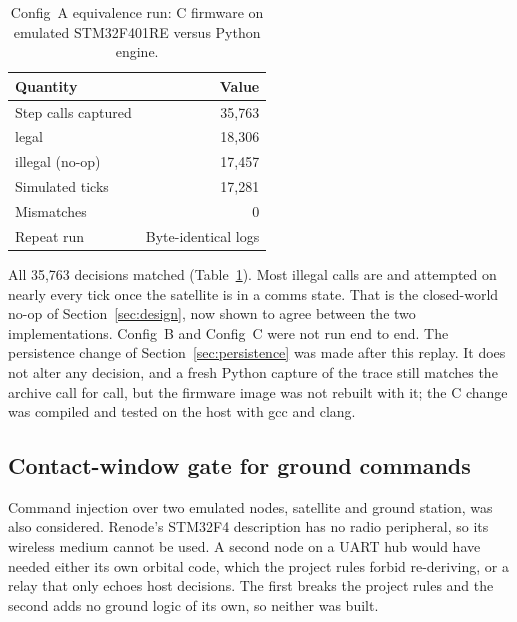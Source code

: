 \documentclass[preprint,12pt]{elsarticle}
\newcommand{\cfgA}{Config~A}
\newcommand{\cfgB}{Config~B}
\newcommand{\cfgC}{Config~C}
\begin{document}
\begin{table}[t]
\centering
\small
\caption{\cfgA{} equivalence run: C firmware on emulated STM32F401RE versus Python engine.}
\label{tab:cport}
\begin{tabular}{@{}lr@{}}
\toprule
Quantity & Value \\
\midrule
Step calls captured & 35,763 \\
\quad legal & 18,306 \\
\quad illegal (no-op) & 17,457 \\
Simulated ticks & 17,281 \\
Mismatches & 0 \\
Repeat run & Byte-identical logs \\
\bottomrule
\end{tabular}
\end{table}

All 35,763 decisions matched (Table~\ref{tab:cport}). Most illegal calls are  and  attempted on nearly every tick once the satellite is in a comms state. That is the closed-world no-op of Section~\ref{sec:design}, now shown to agree between the two implementations. \cfgB{} and \cfgC{} were not run end to end. The persistence change of Section~\ref{sec:persistence} was made after this replay. It does not alter any decision, and a fresh Python capture of the trace still matches the archive call for call, but the firmware image was not rebuilt with it; the C change was compiled and tested on the host with gcc and clang.

\subsection{Contact-window gate for ground commands}

Command injection over two emulated nodes, satellite and ground station, was also considered. Renode's STM32F4 description has no radio peripheral, so its wireless medium cannot be used. A second node on a UART hub would have needed either its own orbital code, which the project rules forbid re-deriving, or a relay that only echoes host decisions. The first breaks the project rules and the second adds no ground logic of its own, so neither was built.
\end{document}
